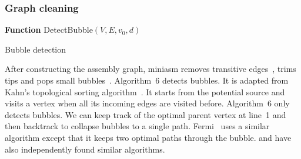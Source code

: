 \documentclass{bioinfo}
\begin{document}
\begin{methods}
\subsubsection{Graph cleaning}

\begin{algorithm}[tb]
\DontPrintSemicolon
\footnotesize
{}
\BlankLine
\textbf{Function} {\sc DetectBubble}$(V,E,v_0,d)$
\caption{Bubble detection}
\end{algorithm}

After constructing the assembly graph, miniasm removes transitive
edges~\citep{Myers:2005bh}, trims tips and pops small
bubbles~\citep{Zerbino:2008uq}. Algorithm~6 detects bubbles. It is
adapted from Kahn's topological sorting algorithm~\citep{Kahn62aa}. It starts
from the potential source and visits a vertex when all its incoming edges are
visited before. Algorithm~6 only detects bubbles. We can keep track of the
optimal parent vertex at line~1 and then backtrack to collapse bubbles to a
single path. Fermi~\citep{Li:2012fk} uses a similar algorithm except that it
keeps two optimal paths through the bubble.  \citet{DBLP:conf/wabi/OnoderaSS13}
and \citet{TCS15} have also independently found similar algorithms.


\end{methods}
\end{document}
